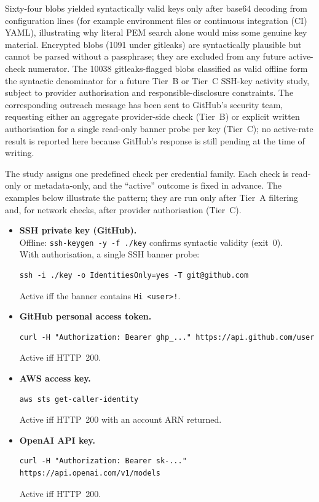 Sixty-four blobs yielded syntactically valid keys only after base64 decoding from configuration lines (for example environment files or continuous integration (CI) YAML), illustrating why literal PEM search alone would miss some genuine key material.
Encrypted blobs (\num{1091} under gitleaks) are syntactically plausible but cannot be parsed without a passphrase; they are excluded from any future active-check numerator.
The \num{10038} gitleaks-flagged blobs classified as valid offline form the syntactic denominator for a future Tier~B or Tier~C SSH-key activity study, subject to provider authorisation and responsible-disclosure constraints.
The corresponding outreach message has been sent to GitHub's security team, requesting either an aggregate provider-side check (Tier~B) or explicit written authorisation for a single read-only banner probe per key (Tier~C); no active-rate result is reported here because GitHub's response is still pending at the time of writing.

The study assigns one predefined check per credential family.
Each check is read-only or metadata-only, and the ``active'' outcome is fixed in advance.
The examples below illustrate the pattern; they are run only after Tier~A filtering and, for network checks, after provider authorisation (Tier~C).

\begin{itemize}
\item \textbf{SSH private key (GitHub).}\\
Offline: \texttt{ssh-keygen -y -f ./key} confirms syntactic validity (exit~0).\\
With authorisation, a single SSH banner probe:
\begin{verbatim}
ssh -i ./key -o IdentitiesOnly=yes -T git@github.com
\end{verbatim}
Active iff the banner contains \texttt{Hi <user>!}.

\item \textbf{GitHub personal access token.}
\begin{verbatim}
curl -H "Authorization: Bearer ghp_..." https://api.github.com/user
\end{verbatim}
Active iff HTTP~200.

\item \textbf{AWS access key.}
\begin{verbatim}
aws sts get-caller-identity
\end{verbatim}
Active iff HTTP~200 with an account ARN returned.

\item \textbf{OpenAI API key.}
\begin{verbatim}
curl -H "Authorization: Bearer sk-..." https://api.openai.com/v1/models
\end{verbatim}
Active iff HTTP~200.
\end{itemize}

